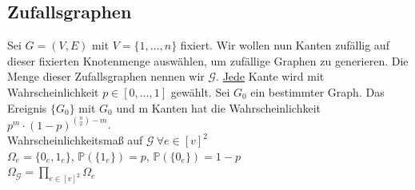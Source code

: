 \newpage
\subsection{Zufallsgraphen}
Sei $G=(V,E)$ mit $V=\{1, \dots, n\}$ fixiert. Wir wollen nun Kanten zufällig auf dieser fixierten Knotenmenge auswählen, um zufällige Graphen zu generieren. 
Die Menge dieser Zufallsgraphen nennen wir $\mathcal{G}$. \underline{Jede} Kante wird mit Wahrscheinlichkeit $p \in [0, \dots, 1]$ gewählt. 
Sei $G_0$ ein bestimmter Graph. Das Ereignis $\{G_0\}$ mit $G_0$ und m Kanten hat die Wahrscheinlichkeit $p^m \cdot (1-p)^{{\binom{n}{2}}-m}$.\\
Wahrscheinlichkeitsmaß auf $\mathcal{G} ~ \forall e \in [v]^2$\\
$\Omega_e=\{0_e, 1_e\}$, $\mathbb{P}(\{1_e\})=p$, $\mathbb{P}(\{0_e\})=1-p$\\
$\Omega_\mathcal{G} = \prod\limits_{e \in [v]^2} \Omega_e$


